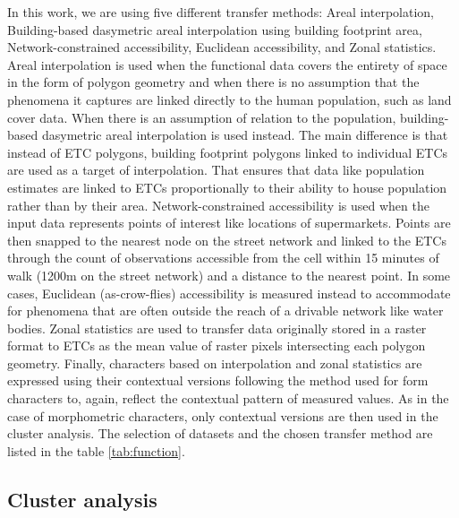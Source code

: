 \documentclass[fleqn,10pt]{wlscirep}
\begin{document}
In this work, we are using five different transfer methods: Areal interpolation,
Building-based dasymetric areal interpolation\cite{eli_knaap_2021_5047613} using building footprint area, Network-constrained accessibility,
Euclidean accessibility, and Zonal statistics. Areal interpolation is used when the
functional data covers the entirety of space in the
form of polygon geometry and when there is no assumption that the phenomena it captures
are linked directly to the human population, such as land cover data. When there is
an assumption of relation to the population, building-based dasymetric areal
interpolation is used instead. The main difference is that instead of ETC polygons,
building footprint polygons linked to individual ETCs are used as a target of
interpolation. That ensures that data like population estimates are linked to ETCs
proportionally to their ability to house population rather than by their area.
Network-constrained accessibility is used when the input data represents points of
interest like locations of supermarkets. Points are then snapped to the nearest node on
the street network and linked to the ETCs through the count of observations
accessible from the cell within 15 minutes of walk (1200m on the street network) and a distance to the nearest point. In
some cases, Euclidean (as-crow-flies) accessibility is measured instead to accommodate
for phenomena that are often outside the reach of a drivable network like water bodies.
Zonal statistics are used to transfer data originally stored in a raster
format to ETCs as the mean value of raster pixels intersecting each polygon
geometry. Finally, characters based on interpolation and zonal statistics are expressed
using their contextual versions following the method used for form characters to, again,
reflect the contextual pattern of measured values. As in the case of morphometric characters,
only contextual versions are then used in the cluster analysis. The selection of datasets and the chosen
transfer method are listed in the table \ref{tab:function}.

\subsection*{Cluster analysis}

\end{document}
